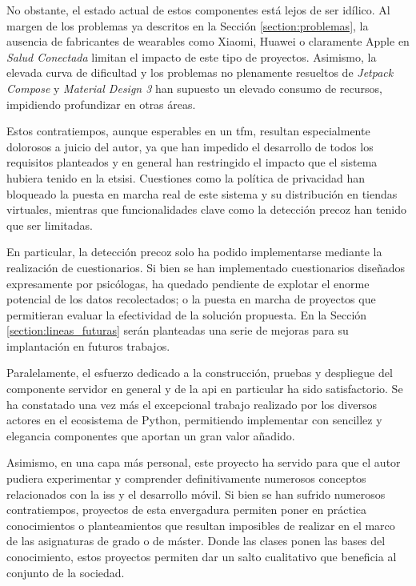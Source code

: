     No obstante, el estado actual de estos componentes está lejos de ser idílico. Al margen de los problemas ya descritos en la Sección \ref{section:problemas}, la ausencia de fabricantes de \glspl{wearable} como Xiaomi, Huawei o claramente Apple en \textit{Salud Conectada} limitan el impacto de este tipo de proyectos. Asimismo, la elevada curva de dificultad y los problemas no plenamente resueltos de \textit{Jetpack Compose} y \textit{Material Design 3} han supuesto un elevado consumo de recursos, impidiendo profundizar en otras áreas.

    Estos contratiempos, aunque esperables en un \gls{tfm}, resultan especialmente dolorosos a juicio del autor, ya que han impedido el desarrollo de todos los requisitos planteados y en general han restringido el impacto que el sistema hubiera tenido en la \gls{etsisi}. Cuestiones como la política de privacidad han bloqueado la puesta en marcha real de este sistema y su distribución en tiendas virtuales, mientras que funcionalidades clave como la detección precoz han tenido que ser limitadas.
    
    En particular, la detección precoz solo ha podido implementarse mediante la realización de cuestionarios. Si bien se han implementado cuestionarios diseñados expresamente por psicólogas, ha quedado pendiente de explotar el enorme potencial de los datos recolectados; o la puesta en marcha de proyectos que permitieran evaluar la efectividad de la solución propuesta. En la Sección \ref{section:lineas_futuras} serán planteadas una serie de mejoras para su implantación en futuros trabajos.

    Paralelamente, el esfuerzo dedicado a la construcción, pruebas y despliegue del componente servidor en general y de la \gls{api} en particular ha sido satisfactorio. Se ha constatado una vez más el excepcional trabajo realizado por los diversos actores en el ecosistema de Python, permitiendo implementar con sencillez y elegancia componentes que aportan un gran valor añadido.

    Asimismo, en una capa más personal, este proyecto ha servido para que el autor pudiera experimentar y comprender definitivamente numerosos conceptos relacionados con la \gls{iss} y el desarrollo móvil. Si bien se han sufrido numerosos contratiempos, proyectos de esta envergadura permiten poner en práctica conocimientos o planteamientos que resultan imposibles de realizar en el marco de las asignaturas de grado o de máster. Donde las clases ponen las bases del conocimiento, estos proyectos permiten dar un salto cualitativo que beneficia al conjunto de la sociedad. 

